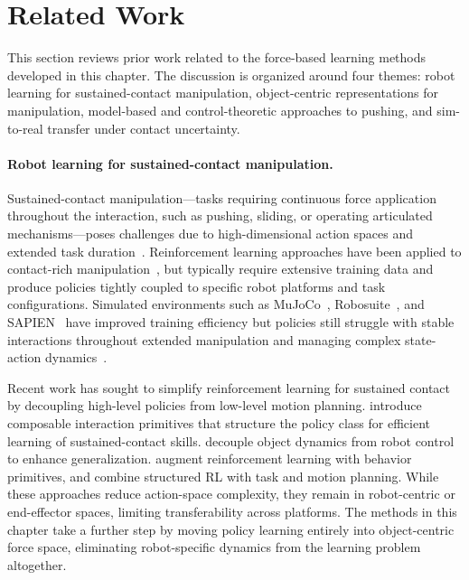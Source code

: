 \section{Related Work}
\label{sec:gen_related_work}

This section reviews prior work related to the force-based learning methods developed in this chapter. The discussion is organized around four themes: robot learning for sustained-contact manipulation, object-centric representations for manipulation, model-based and control-theoretic approaches to pushing, and sim-to-real transfer under contact uncertainty.

\paragraph{Robot learning for sustained-contact manipulation.}
Sustained-contact manipulation---tasks requiring continuous force application throughout the interaction, such as pushing, sliding, or operating articulated mechanisms---poses challenges due to high-dimensional action spaces and extended task duration~\citep{kroemer2021review}. Reinforcement learning approaches have been applied to contact-rich manipulation~\citep{gu2017deep,kalashnikov2018scalable}, but typically require extensive training data and produce policies tightly coupled to specific robot platforms and task configurations. Simulated environments such as MuJoCo~\citep{todorov2012mujoco}, Robosuite~\citep{zhu2020robosuite}, and SAPIEN~\citep{xiang2020sapien} have improved training efficiency but policies still struggle with stable interactions throughout extended manipulation and managing complex state-action dynamics~\citep{elguea2023review}.

Recent work has sought to simplify reinforcement learning for sustained contact by decoupling high-level policies from low-level motion planning. \citet{abbatematteo2024composable} introduce composable interaction primitives that structure the policy class for efficient learning of sustained-contact skills. \citet{lu2023decoupling} decouple object dynamics from robot control to enhance generalization. \citet{nasiriany2022augmenting} augment reinforcement learning with behavior primitives, and \citet{rosen2022role} combine structured RL with task and motion planning. While these approaches reduce action-space complexity, they remain in robot-centric or end-effector spaces, limiting transferability across platforms. The methods in this chapter take a further step by moving policy learning entirely into object-centric force space, eliminating robot-specific dynamics from the learning problem altogether.


